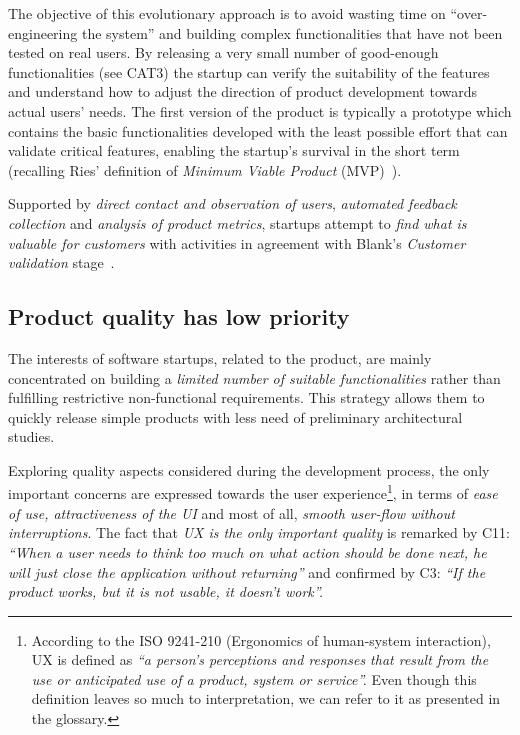 \documentclass[10pt,journal,letterpaper,compsoc]{IEEEtran}
\begin{document}
The objective of this evolutionary approach is to avoid wasting time on 
``over-engineering the system'' and building complex functionalities that have 
not been tested on real users. By releasing a very small number of good-enough
functionalities (see CAT3) the startup can verify the suitability of the
features and understand how to adjust the direction of product development
towards actual users' needs. The first version of the product is typically a
prototype which contains the basic functionalities developed with the least
possible effort that can validate critical features, enabling the startup's
survival in the short term (recalling Ries' definition of \textit{Minimum
Viable Product} (MVP)~\cite{Ries2011}).

Supported by \textit{direct contact and observation of users},
\textit{automated feedback collection} and \textit{analysis of product metrics},
startups attempt to \textit{find what is valuable for customers} with activities
in agreement with Blank's \textit{Customer validation} stage~\cite{Blank2005}.

\subsection{Product quality has low priority}\label{res:gsm:cat3}
The interests of software startups, related to the product, are mainly 
concentrated on building a \textit{limited number of suitable functionalities} 
rather than fulfilling restrictive non-functional requirements. This strategy 
allows them to quickly release simple products with less need of preliminary 
architectural studies.


Exploring quality aspects considered during the development process, the only
important concerns are expressed towards the user experience\footnote{According
to the ISO 9241-210 (Ergonomics of human-system interaction), UX is defined as
\textit{``a person's perceptions and responses that result from the use or
anticipated use of a product, system or service''.} Even though this definition
leaves so much to interpretation, we can refer to it as presented in the
glossary.}, in terms of \textit{ease of use, attractiveness of the UI} and most
of all, \textit{smooth user-flow without interruptions}. The fact that
\textit{UX is the only important quality} is remarked by C11: \textit{``When a
user needs to think too much on what action should be done next, he will just
close the application without returning''} and confirmed by C3: \textit{``If the
product works, but it is not usable, it doesn't work''.}
\end{document}

